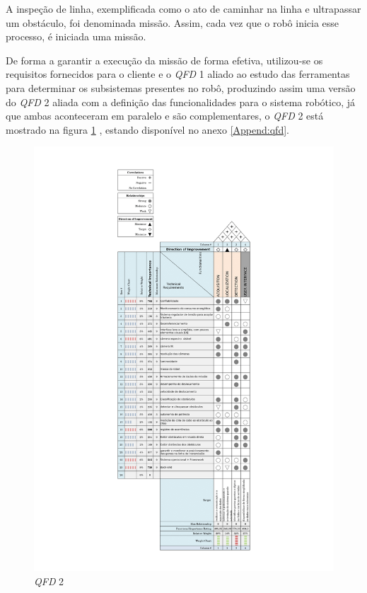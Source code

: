 A inspeção de linha, exemplificada como o ato de caminhar na linha e ultrapassar um obstáculo, foi denominada missão. Assim, cada vez que o robô inicia esse processo, é iniciada uma missão.

De forma a garantir a execução da missão de forma efetiva, utilizou-se os requisitos fornecidos para o cliente e o \textit{QFD} 1 aliado ao estudo das ferramentas para determinar os subsistemas presentes no robô, produzindo assim uma versão do \textit{QFD} 2 aliada com a definição das funcionalidades para o sistema robótico, já que ambas aconteceram em paralelo e são complementares, o \textit{QFD} 2 está mostrado na figura \ref{fig:qfd2} , estando disponível no anexo \ref{Append:qfd}.

\begin{figure}[H]
	\centering
	\includegraphics[scale=0.17]{Figures/qfd2-1.png}
	\caption{\textit{QFD} 2}
	\label{fig:qfd2}
\end{figure}

